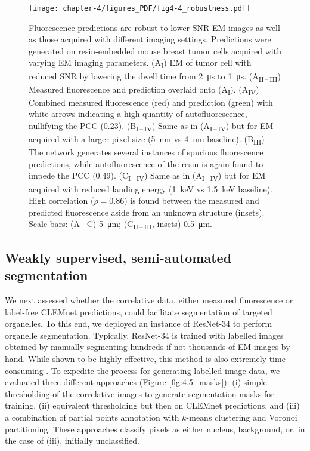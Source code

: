 \begin{figure}[!tb]
    \centering
    \texttt{[image: chapter-4/figures\_PDF/fig4-4\_robustness.pdf]}
    \caption{Fluorescence predictions are robust to lower SNR EM images as well as those acquired with different imaging settings.
    Predictions were generated on resin-embedded mouse breast tumor cells acquired with varying EM imaging parameters.
    (A\textsubscript{I}) EM of tumor cell with reduced SNR by lowering the dwell time from \SI{2}{\micro\second} to \SI{1}{\micro\second}. (A\textsubscript{II\,--\,III}) Measured fluorescence and prediction overlaid onto (A\textsubscript{I}). (A\textsubscript{IV}) Combined measured fluorescence (red) and prediction (green) with white arrows indicating a high quantity of autofluorescence, nullifying the PCC (0.23).
    (B\textsubscript{I\,--\,IV}) Same as in (A\textsubscript{I\,--\,IV}) but for EM acquired with a larger pixel size (\SI{5}{\nano\meter} vs \SI{4}{\nano\meter} baseline). (B\textsubscript{III}) The network generates several instances of spurious fluorescence predictions, while autofluorescence of the resin is again found to impede the PCC (0.49).
    (C\textsubscript{I\,--\,IV}) Same as in (A\textsubscript{I\,--\,IV}) but for EM acquired with reduced landing energy (\SI{1}{\kilo\electronvolt} vs  \SI{1.5}{\kilo\electronvolt} baseline). High correlation ($\rho\!=\!\text{0.86}$) is found between the measured and predicted fluorescence aside from an unknown structure (insets). Scale bars: (A\,--\,C) \SI{5}{\micro\meter}; (C\textsubscript{II\,--\,III}, insets) \SI{0.5}{\micro\meter}.}
    \label{fig:4.4_robustness}
\end{figure}


\subsection{Weakly supervised, semi-automated segmentation}
\label{sec:4results_segmentation}

We next assessed whether the correlative data, either measured fluorescence or label-free CLEMnet predictions, could facilitate segmentation of targeted organelles. To this end, we deployed an instance of ResNet-34 \cite{he2016deep} to perform organelle segmentation. Typically, ResNet-34 is trained with labelled images obtained by manually segmenting hundreds if not thousands of EM images by hand. While shown to be highly effective, this method is also extremely time consuming \cite{muller20213d, januszewski2018high, spiers2021deep, heinrich2021whole, conrad2022instance}. To expedite the process for generating labelled image data, we evaluated three different approaches (Figure \ref{fig:4.5_masks}): (i) simple thresholding of the correlative images to generate segmentation masks for training, (ii) equivalent thresholding but then on CLEMnet predictions, and (iii) a combination of partial points annotation with $k$-means clustering and Voronoi partitioning. These approaches classify pixels as either nucleus, background, or, in the case of (iii), initially unclassified.

